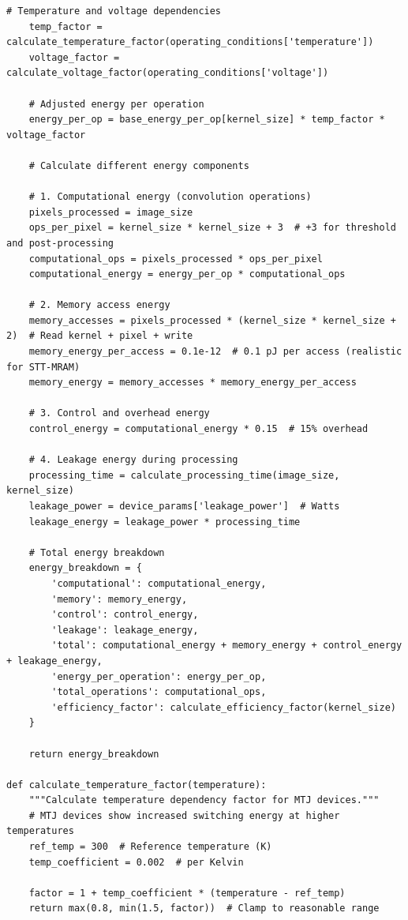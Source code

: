\documentclass[conference]{IEEEtran}
\begin{document}
{{{{\begin{lstlisting}[caption={Comprehensive energy consumption calculation with device modeling}]
    # Temperature and voltage dependencies
    temp_factor = calculate_temperature_factor(operating_conditions['temperature'])
    voltage_factor = calculate_voltage_factor(operating_conditions['voltage'])
    
    # Adjusted energy per operation
    energy_per_op = base_energy_per_op[kernel_size] * temp_factor * voltage_factor
    
    # Calculate different energy components
    
    # 1. Computational energy (convolution operations)
    pixels_processed = image_size
    ops_per_pixel = kernel_size * kernel_size + 3  # +3 for threshold and post-processing
    computational_ops = pixels_processed * ops_per_pixel
    computational_energy = energy_per_op * computational_ops
    
    # 2. Memory access energy
    memory_accesses = pixels_processed * (kernel_size * kernel_size + 2)  # Read kernel + pixel + write
    memory_energy_per_access = 0.1e-12  # 0.1 pJ per access (realistic for STT-MRAM)
    memory_energy = memory_accesses * memory_energy_per_access
    
    # 3. Control and overhead energy
    control_energy = computational_energy * 0.15  # 15% overhead
    
    # 4. Leakage energy during processing
    processing_time = calculate_processing_time(image_size, kernel_size)
    leakage_power = device_params['leakage_power']  # Watts
    leakage_energy = leakage_power * processing_time
    
    # Total energy breakdown
    energy_breakdown = {
        'computational': computational_energy,
        'memory': memory_energy,
        'control': control_energy,
        'leakage': leakage_energy,
        'total': computational_energy + memory_energy + control_energy + leakage_energy,
        'energy_per_operation': energy_per_op,
        'total_operations': computational_ops,
        'efficiency_factor': calculate_efficiency_factor(kernel_size)
    }
    
    return energy_breakdown

def calculate_temperature_factor(temperature):
    """Calculate temperature dependency factor for MTJ devices."""
    # MTJ devices show increased switching energy at higher temperatures
    ref_temp = 300  # Reference temperature (K)
    temp_coefficient = 0.002  # per Kelvin
    
    factor = 1 + temp_coefficient * (temperature - ref_temp)
    return max(0.8, min(1.5, factor))  # Clamp to reasonable range


\end{lstlisting}}}}}
\end{document}
